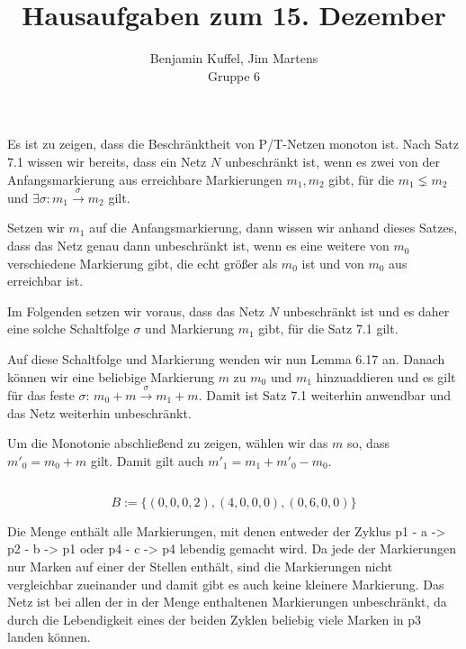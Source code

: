 \documentclass[10pt,a4paper,oneside,ngerman,numbers=noenddot]{scrartcl}
\begin{document}
\author{Benjamin Kuffel, Jim Martens\\Gruppe 6}
\title{Hausaufgaben zum 15. Dezember}
\maketitle

\setcounter{section}{2}
\section{} %
\subsection{}
Es ist zu zeigen, dass die Beschränktheit von P/T-Netzen monoton ist. Nach Satz 7.1 wissen wir bereits, dass ein Netz \(N\) unbeschränkt ist, wenn es zwei von der Anfangsmarkierung aus erreichbare Markierungen \(m_1,m_2\) gibt, für die \(m_1 \lneq m_2\) und \(\exists \sigma : m_1 \overset{\sigma}{\rightarrow} m_2\) gilt.

Setzen wir \(m_{1}\) auf die Anfangsmarkierung, dann wissen wir anhand dieses Satzes, dass das Netz genau dann unbeschränkt ist, wenn es eine weitere von \(m_0\) verschiedene Markierung gibt, die echt größer als \(m_0\) ist und von \(m_0\) aus erreichbar ist.

Im Folgenden setzen wir voraus, dass das Netz \(N\) unbeschränkt ist und es daher eine solche Schaltfolge \(\sigma\) und Markierung \(m_1\) gibt, für die Satz 7.1 gilt.

Auf diese Schaltfolge und Markierung wenden wir nun Lemma 6.17 an. Danach können wir eine beliebige Markierung \(m\) zu \(m_0\) und \(m_1\) hinzuaddieren und es gilt für das feste \(\sigma\): \(m_0 + m \overset{\sigma}{\rightarrow} m_1 + m\). Damit ist Satz 7.1 weiterhin anwendbar und das Netz weiterhin unbeschränkt.

Um die Monotonie abschließend zu zeigen, wählen wir das \(m\) so, dass \(m'_0 = m_0 + m\) gilt. Damit gilt auch \(m'_1 = m_1 + m'_0 - m_0\).

\subsection{}
\[
	B := \{(0,0,0,2),(4,0,0,0),(0,6,0,0)\}
\]

Die Menge enthält alle Markierungen, mit denen entweder der Zyklus p1 - a -> p2 - b -> p1 oder p4 - c -> p4 lebendig gemacht wird. Da jede der Markierungen nur Marken auf einer der Stellen enthält, sind die Markierungen nicht vergleichbar zueinander und damit gibt es auch keine kleinere Markierung. Das Netz ist bei allen der in der Menge enthaltenen Markierungen unbeschränkt, da durch die Lebendigkeit eines der beiden Zyklen beliebig viele Marken in p3 landen können.
\section{} %
\subsection{}

\section{} %
\end{document}

